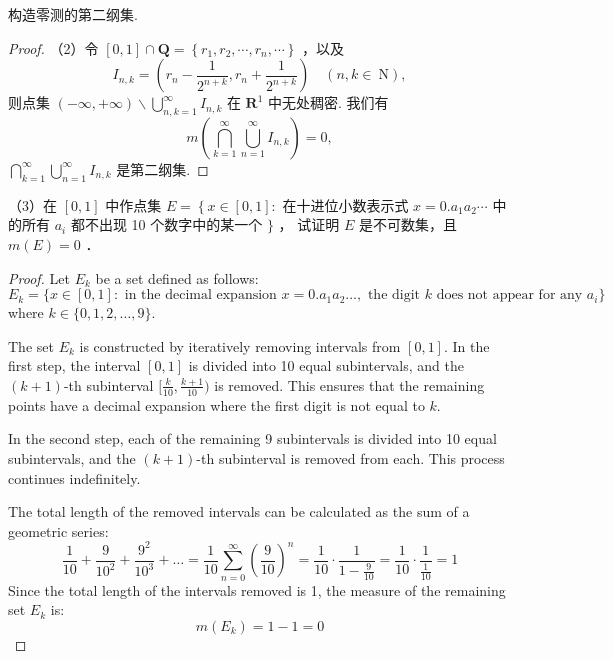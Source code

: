 \begin{exercise}
构造零测的第二纲集.
\end{exercise}
\begin{proof}
（2）令 $[0,1] \cap \mathbf{Q}=\left\{r_1, r_2, \cdots, r_n, \cdots\right\}$ ，以及
\[
I_{n, k}=\left(r_n-\frac{1}{2^{n+k}}, r_n+\frac{1}{2^{n+k}}\right) \quad(n, k \in \mathrm{~N}),
\]
则点集 $(-\infty,+\infty) \backslash \bigcup_{n, k=1}^{\infty} I_{n, k}$ 在 $\mathbf{R}^1$ 中无处稠密. 我们有
\[
m\left(\bigcap_{k=1}^{\infty} \bigcup_{n=1}^{\infty} I_{n, k}\right)=0,
\]
$\bigcap_{k=1}^{\infty} \bigcup_{n=1}^{\infty} I_{n, k}$ 是第二纲集.
\end{proof}

\begin{exercise}
（3）在 $[0,1]$ 中作点集
$E=\left\{x \in[0,1]:\right.$ 在十进位小数表示式 $x=0 . a_1 a_2 \cdots$ 中的所有 $a_i$ 都不出现 10 个数字中的某一个 $\}$ ，
试证明 $E$ 是不可数集，且 $m(E)=0$ ．
\end{exercise}
\begin{proof}
Let $E_k$ be a set defined as follows:
\[
E_k = \{x \in [0,1]: \text{ in the decimal expansion } x = 0.a_1 a_2 \dots, \text{ the digit } k \text{ does not appear for any } a_i \}
\]
where $k \in \{0, 1, 2, \dots, 9\}$.

The set $E_k$ is constructed by iteratively removing intervals from $[0,1]$. In the first step, the interval $[0,1]$ is divided into 10 equal subintervals, and the $(k+1)$-th subinterval $[\frac{k}{10}, \frac{k+1}{10})$ is removed. This ensures that the remaining points have a decimal expansion where the first digit is not equal to $k$.

In the second step, each of the remaining 9 subintervals is divided into 10 equal subintervals, and the $(k+1)$-th subinterval is removed from each. This process continues indefinitely.

The total length of the removed intervals can be calculated as the sum of a geometric series:
\[
\frac{1}{10} + \frac{9}{10^2} + \frac{9^2}{10^3} + \dots = \frac{1}{10} \sum_{n=0}^{\infty} \left(\frac{9}{10}\right)^n = \frac{1}{10} \cdot \frac{1}{1 - \frac{9}{10}} = \frac{1}{10} \cdot \frac{1}{\frac{1}{10}} = 1
\]
Since the total length of the intervals removed is 1, the measure of the remaining set $E_k$ is:
\[
m(E_k) = 1 - 1 = 0
\]
\end{proof}

